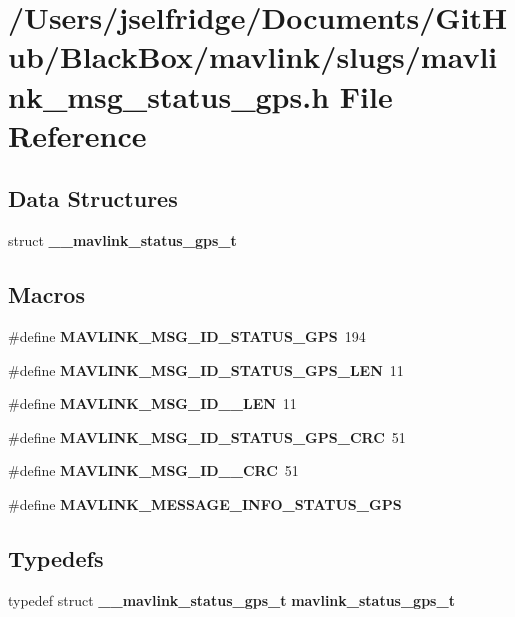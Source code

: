 \section{/\+Users/jselfridge/\+Documents/\+Git\+Hub/\+Black\+Box/mavlink/slugs/mavlink\+\_\+msg\+\_\+status\+\_\+gps.h File Reference}
\label{mavlink__msg__status__gps_8h}
\subsection*{Data Structures}
\begin{DoxyCompactItemize}
\item 
struct \textbf{ \+\_\+\+\_\+mavlink\+\_\+status\+\_\+gps\+\_\+t}
\end{DoxyCompactItemize}
\subsection*{Macros}
\begin{DoxyCompactItemize}
\item 
\#define \textbf{ M\+A\+V\+L\+I\+N\+K\+\_\+\+M\+S\+G\+\_\+\+I\+D\+\_\+\+S\+T\+A\+T\+U\+S\+\_\+\+G\+PS}~194
\item 
\#define \textbf{ M\+A\+V\+L\+I\+N\+K\+\_\+\+M\+S\+G\+\_\+\+I\+D\+\_\+\+S\+T\+A\+T\+U\+S\+\_\+\+G\+P\+S\+\_\+\+L\+EN}~11
\item 
\#define \textbf{ M\+A\+V\+L\+I\+N\+K\+\_\+\+M\+S\+G\+\_\+\+I\+D\+\_\+\_\+\+L\+EN}~11
\item 
\#define \textbf{ M\+A\+V\+L\+I\+N\+K\+\_\+\+M\+S\+G\+\_\+\+I\+D\+\_\+\+S\+T\+A\+T\+U\+S\+\_\+\+G\+P\+S\+\_\+\+C\+RC}~51
\item 
\#define \textbf{ M\+A\+V\+L\+I\+N\+K\+\_\+\+M\+S\+G\+\_\+\+I\+D\+\_\+\_\+\+C\+RC}~51
\item 
\#define \textbf{ M\+A\+V\+L\+I\+N\+K\+\_\+\+M\+E\+S\+S\+A\+G\+E\+\_\+\+I\+N\+F\+O\+\_\+\+S\+T\+A\+T\+U\+S\+\_\+\+G\+PS}
\end{DoxyCompactItemize}
\subsection*{Typedefs}
\begin{DoxyCompactItemize}
\item 
typedef struct \textbf{ \+\_\+\+\_\+mavlink\+\_\+status\+\_\+gps\+\_\+t} \textbf{ mavlink\+\_\+status\+\_\+gps\+\_\+t}
\end{DoxyCompactItemize}


